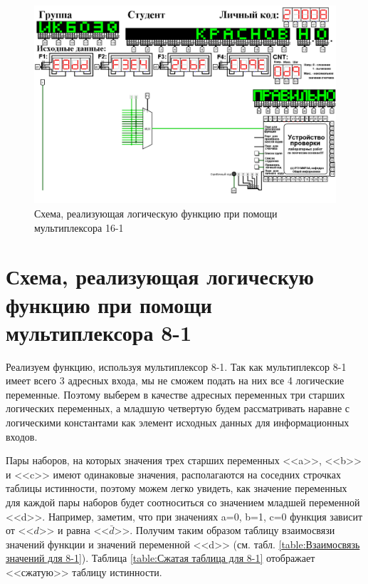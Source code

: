 \documentclass{mirea}
\begin{document}
\begin{figure}[h!]
	\includegraphics[width=\textwidth]{Мультиплекс 16-1.png}
	\caption{Схема, реализующая логическую функцию при помощи мультиплексора 16-1}
	\label{circ:Мультиплекс 16-1}
\end{figure}

\section{Схема, реализующая логическую функцию при помощи мультиплексора 8-1}	
Реализуем функцию, используя мультиплексор 8-1. Так как мультиплексор 8-1 имеет всего 3 адресных входа, мы не сможем подать на них все 4 логические переменные. Поэтому выберем в качестве адресных переменных три старших логических переменных, а младшую четвертую будем рассматривать наравне с логическими константами как элемент исходных данных для информационных входов.

Пары наборов, на которых значения трех старших переменных <<a>>, <<b>> и <<c>> имеют одинаковые значения, располагаются на соседних строчках таблицы истинности, поэтому можем легко увидеть, как значение переменных для каждой пары наборов будет соотноситься со значением младшей переменной <<d>>. Например, заметим, что при значениях a=0, b=1, c=0 функция зависит от <<$d$>> и равна <<$\bar{d}$>>. Получим таким образом таблицу взаимосвязи значений функции и значений переменной <<d>> (см. табл. \ref{table:Взаимосвязь значений для 8-1}). Таблица \ref{table:Сжатая таблица для 8-1} отображает <<сжатую>> таблицу истинности.
\end{document}
